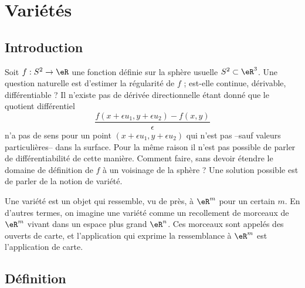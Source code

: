 
\section{Variétés}

\subsection{Introduction}
Soit $f : S^2 \to \eR$ une fonction définie sur la sphère usuelle
$S^2 \subset \eR^3$. Une question naturelle est d'estimer la
régularité de $f$ ; est-elle continue, dérivable, différentiable ? Il
n'existe pas de dérivée directionnelle étant donné que le quotient
différentiel
\begin{equation*}
  \frac{f(x + \epsilon u_1 ,y + \epsilon u_2) - f(x,y)}{\epsilon}
\end{equation*}
n'a pas de sens pour un point $(x + \epsilon u_1 ,y + \epsilon u_2)$
qui n'est pas --sauf valeurs particulières-- dans la surface. Pour la
même raison il n'est pas possible de parler de différentiabilité de
cette manière. Comment faire, sans devoir étendre le domaine de
définition de $f$ à un voisinage de la sphère ? Une solution possible
est de parler de la notion de variété.

Une variété est un objet qui ressemble, vu de près, à $\eR^m$ pour un
certain $m$. En d'autres termes, on imagine une variété comme un
recollement de morceaux de $\eR^m$ vivant dans un espace plus grand
$\eR^n$. Ces morceaux sont appelés des ouverts de carte, et
l'application qui exprime la ressemblance à $\eR^m$ est l'application
de carte.

\subsection{Définition}


